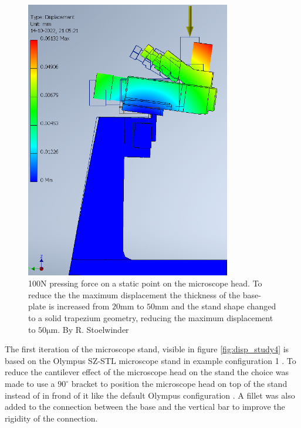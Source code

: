 \documentclass[10pt]{article}
\begin{document}
\begin{figure}[H]
\begin{minipage}[b]{0.45\textwidth}
    \includegraphics[width=0.8\textwidth]{img/rigidity_simulation/study_7.png}
    \caption{100N pressing force on a static point on the microscope head. To reduce the the maximum displacement the thickness of the base-plate is increased from $20\mathrm{mm}$ to $50\mathrm{mm}$ and the stand shape changed to a solid trapezium geometry, reducing the maximum displacement to $50\mathrm{\mu m}$. By R. Stoelwinder}
    \label{fig:disp_study7}
  \end{minipage}
\end{figure}

The first iteration of the microscope stand, visible in figure \ref{fig:disp_study4} is based on the Olympus SZ-STL microscope stand  in example configuration 1 . 
To reduce the cantilever effect of the microscope head on the stand the choice was made to use a $90^\circ$ bracket to position the microscope head on top of the stand instead of in frond of it like the default Olympus configuration . 
A fillet was also added to the connection between the base and the vertical bar to improve the rigidity of the connection.\\
\end{document}
